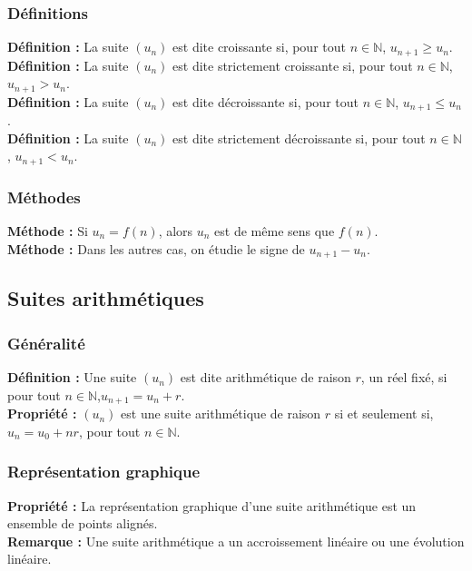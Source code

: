 \documentclass[a4paper,titlepage]{article}
\begin{document}
        \subsubsection{Définitions}
            \textbf{Définition :} La suite $\left(u_{n}\right)$ est dite croissante si, pour tout $n\in\mathbb{N}$, $u_{n+1}\geq u_{n}$.
            \\
            \textbf{Définition :} La suite $\left(u_{n}\right)$ est dite strictement croissante si, pour tout $n\in\mathbb{N}$, $u_{n+1}>u_{n}$.
            \\
            \textbf{Définition :} La suite $\left(u_{n}\right)$ est dite décroissante si, pour tout $n\in\mathbb{N}$, $u_{n+1}\leq u_{n}$.
            \\
            \textbf{Définition :} La suite $\left(u_{n}\right)$ est dite strictement décroissante si, pour tout $n\in\mathbb{N}$, $u_{n+1}<u_{n}$.
        \subsubsection{Méthodes}
            \textbf{Méthode :} Si $u_{n}=f\left(n\right)$, alors $u_{n}$ est de même sens que $f\left(n\right)$.\\
            \textbf{Méthode :} Dans les autres cas, on étudie le signe de $u_{n+1}-u_{n}$.
    \subsection{Suites arithmétiques}
        \subsubsection{Généralité}
            \textbf{Définition :} Une suite $\left(u_{n}\right)$ est dite arithmétique de raison $r$, un réel fixé, si pour tout $n\in\mathbb{N}$,\linebreak$u_{n+1}=u_{n}+r$.
            \\
            \textbf{Propriété :} $\left(u_{n}\right)$ est une suite arithmétique de raison $r$ si et seulement si, $u_{n}=u_{0}+nr$, pour tout $n\in\mathbb{N}$.
        \subsubsection{Représentation graphique}
            \textbf{Propriété :} La représentation graphique d’une suite arithmétique est un ensemble de points alignés.
            \\
            \textbf{Remarque :} Une suite arithmétique a un accroissement linéaire ou une évolution linéaire.
\end{document}
